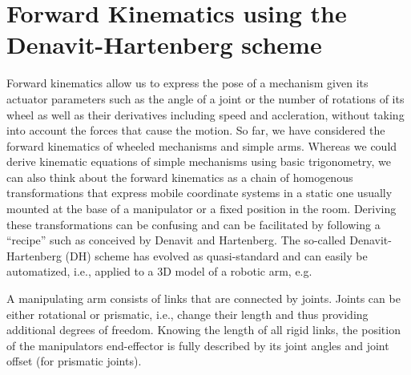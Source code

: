 \section{Forward Kinematics using the Denavit-Hartenberg scheme}
Forward kinematics allow us to express the pose of a mechanism given its actuator parameters such as the angle of a joint or the number of rotations of its wheel as well as their derivatives including speed and accleration, without taking into account the forces that cause the motion. So far, we have considered the forward kinematics of wheeled mechanisms and simple arms. Whereas we could derive kinematic equations of simple mechanisms using basic trigonometry, we can also think about the forward kinematics as a chain of homogenous transformations that express mobile coordinate systems in a static one usually mounted at the base of a manipulator or a fixed position in the room. Deriving these transformations can be confusing and can be facilitated by following a ``recipe'' such as conceived by Denavit and Hartenberg. The so-called Denavit-Hartenberg (DH) scheme has evolved as quasi-standard and can easily be automatized, i.e., applied to a 3D model of a robotic arm, e.g. 

A manipulating arm consists of links that are connected by joints. Joints can be either rotational or prismatic, i.e., change their length and thus providing additional degrees of freedom. Knowing the length of all rigid links, the position of the manipulators end-effector is fully described by its joint angles and joint offset (for prismatic joints).


